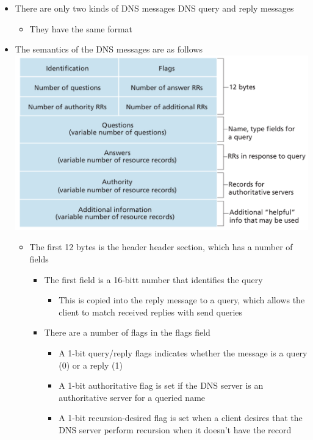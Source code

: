 \documentclass[11pt]{article}
\makeatletter
\def\maxwidth{\ifdim\Gin@nat@width>\linewidth\linewidth
    \else\Gin@nat@width\fi}
\let\Oldincludegraphics\includegraphics
\renewcommand{\includegraphics}[1]{\Oldincludegraphics[width=.8\maxwidth]{#1}}
\providecommand{\tightlist}{%
      \setlength{\itemsep}{0pt}\setlength{\parskip}{0pt}}
\makeatother
\begin{document}
\begin{itemize}
\tightlist
\item
  There are only two kinds of DNS messages DNS query and reply messages

  \begin{itemize}
  \tightlist
  \item
    They have the same format
  \end{itemize}
\item
  The semantics of the DNS messages are as follows
  \includegraphics{img/dns_message_format.png}

  \begin{itemize}
  \tightlist
  \item
    The first 12 bytes is the header header section, which has a number
    of fields

    \begin{itemize}
    \tightlist
    \item
      The first field is a 16-bitt number that identifies the query

      \begin{itemize}
      \tightlist
      \item
        This is copied into the reply message to a query, which allows
        the client to match received replies with send queries
      \end{itemize}
    \item
      There are a number of flags in the flags field

      \begin{itemize}
      \tightlist
      \item
        A 1-bit query/reply flags indicates whether the message is a
        query (0) or a reply (1)
      \item
        A 1-bit authoritative flag is set if the DNS server is an
        authoritative server for a queried name
      \item
        A 1-bit recursion-desired flag is set when a client desires that
        the DNS server perform recursion when it doesn't have the record


\end{itemize}
\end{itemize}
\end{itemize}
\end{itemize}
\end{document}
